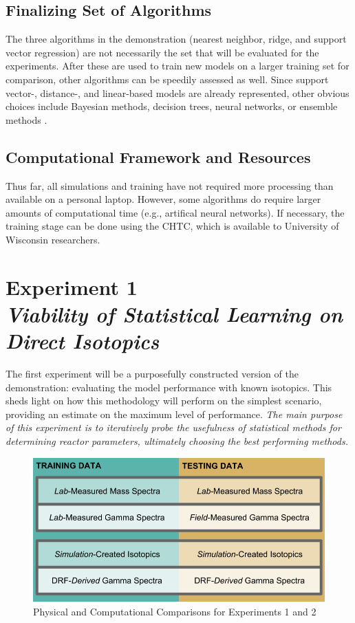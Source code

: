 \subsection*{Finalizing Set of Algorithms}

The three algorithms in the demonstration (nearest neighbor, ridge, and support
vector regression) are not necessarily the set that will be evaluated for the
experiments. After these are used to train new models on a larger training set
for comparison, other algorithms can be speedily assessed as well.  Since
support vector-, distance-, and linear-based models are already represented,
other obvious choices include Bayesian methods, decision trees, neural
networks, or ensemble methods \cite{elements_stats}. 

\subsection*{Computational Framework and Resources}

Thus far, all simulations and training have not required more processing than
available on a personal laptop. However, some algorithms do require larger
amounts of computational time (e.g., artifical neural networks).  If necessary,
the training stage can be done using the \gls{CHTC}, which is available to
University of Wisconsin researchers. 

\section[Experiment 1: Direct Isotopics]{Experiment 1\\ 
\large{\textit{Viability of Statistical Learning on Direct Isotopics}}}
\label{sec:exp1}

The first experiment will be a purposefully constructed version of the
demonstration: evaluating the model performance with known isotopics.  This
sheds light on how this methodology will perform on the simplest scenario,
providing an estimate on the maximum level of performance.  \textit{The main
purpose of this experiment is to iteratively probe the usefulness of
statistical methods for determining reactor parameters, ultimately choosing the 
best performing methods.}
\\
\begin{figure}[!htb]
    \centering
    \includegraphics[width=\linewidth]{./chapters/proposal/proposal.png}
    \caption{Physical and Computational Comparisons for Experiments 1 and 2}
    \label{fig:proposal}
\end{figure}

